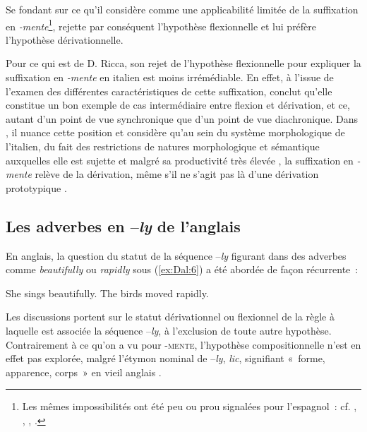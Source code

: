\documentclass[output=paper]{langsci/langscibook}
\begin{document}
Se fondant sur ce qu'il considère comme une applicabilité limitée de la suffixation en \emph{-mente}\footnote{Les mêmes impossibilités ont été peu ou prou signalées pour l'espagnol~: cf. %
\citet{Egea93}%
%
, %
\citet{Garcia91}%
%
, %
\citet{Kovacci99}%
%
, %
\citet{Fabregas07}%
%
.}, %
\citet{Scalise90} %
%
rejette par conséquent l'hypothèse flexionnelle et lui préfère l'hypothèse dérivationnelle.

Pour ce qui est de D. Ricca, son rejet de l'hypothèse flexionnelle pour expliquer la suffixation en \emph{-mente} en italien est moins irrémédiable. En effet, à l'issue de l'examen des différentes caractéristiques de cette suffixation, %
\citet{Ricca98} %
%
conclut qu'elle constitue un bon exemple de cas intermédiaire entre flexion et dérivation, et ce, autant d'un point de vue synchronique que d'un point de vue diachronique. Dans %
\citet{Ricca04}%
%
, il nuance cette position et considère qu'au sein du système morphologique de l'italien, du fait des restrictions de natures morphologique et sémantique auxquelles elle est sujette et malgré sa productivité très élevée %
\citep[cf. aussi ][]{Gaeta08}%
%
, la suffixation en \emph{-mente} relève de la dérivation, même s'il ne s'agit pas là d'une dérivation prototypique %
\citep[473]{Ricca04}%
%
.

\subsection{Les adverbes en --\emph{ly} de l'anglais}\label{section:dal:2.2}

En anglais, la question du statut de la séquence --\emph{ly} figurant dans des adverbes comme \emph{beautifully} ou \emph{rapidly} sous (\ref{ex:Dal:6}) a été abordée de façon récurrente~:

\ea\label{ex:Dal:6}
    \ea She sings beautifully.
    \ex The birds moved rapidly.
\z\z

Les discussions portent sur le statut dérivationnel ou flexionnel de la règle à laquelle est associée la séquence --\emph{ly}, à l'exclusion de toute autre hypothèse. Contrairement à ce qu'on a vu pour -\textsc{mente}, l'hypothèse compositionnelle n'est en effet pas explorée, malgré l'étymon nominal de --\emph{ly}, \emph{lic}, signifiant «~forme, apparence, corps~» en vieil anglais %
\citep[cf. notamment ][]{Jespersen54,Ricca15}%
%
.
\end{document}
